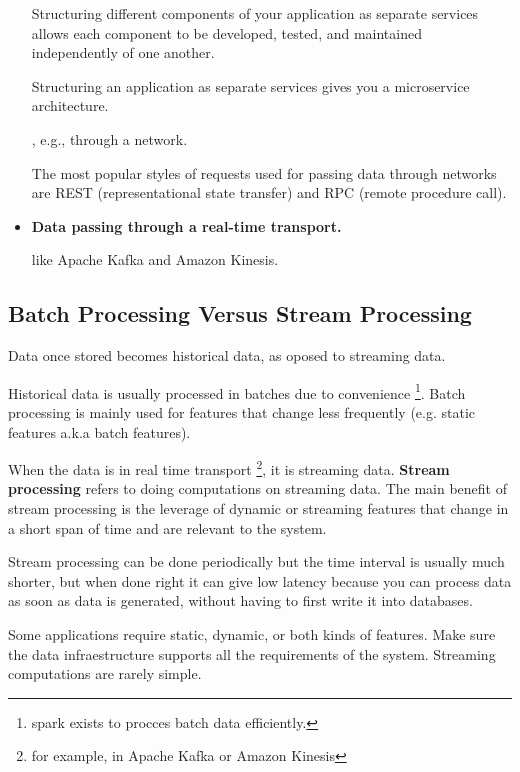 \begin{itemize}
{        Structuring different components of your application as
        separate services allows each component to be developed,
        tested, and maintained independently of one another.
        
        Structuring an application as separate services gives you
        a microservice architecture.
    }, e.g., through a network.
    
    The most popular styles of requests used for passing data
    through networks are REST (representational state transfer)
    and RPC (remote procedure call).
    
    \item \textbf{Data passing through a real-time transport.}

    \noindent
    like Apache Kafka and Amazon Kinesis.
\end{itemize}

















\subsection{Batch Processing Versus Stream Processing}
Data once stored becomes historical data, as oposed to streaming 
data.

Historical data is usually processed in batches due to
convenience
\footnote{
    spark exists to procces batch data efficiently.
}. Batch processing is mainly used for features that change less
frequently (e.g. static features a.k.a batch features).

When the data is in real time transport
\footnote{
    for example, in Apache Kafka or Amazon Kinesis
},
it is streaming data. \textbf{Stream processing} refers to doing
computations on streaming data. The main benefit of stream
processing is the leverage of dynamic or streaming features that
change in a short span of time and are relevant to the system.

Stream processing can be done periodically but the time interval is
usually much shorter, but when done right it can give low latency
because you can process data as soon as data is generated, without
having to first write it into databases.

Some applications require static, dynamic, or both kinds of features.
Make sure the data infraestructure supports all the requirements of
the system. Streaming computations are rarely simple.











